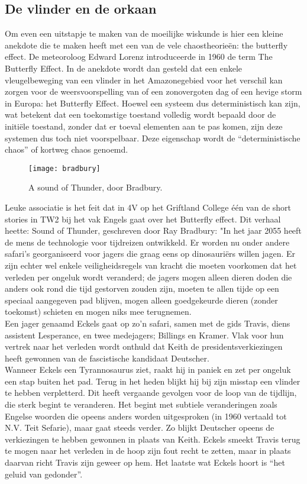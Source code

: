 \documentclass[11pt,fleqn]{book} %
\begin{document}
\subsection{De vlinder en de orkaan}
Om even een uitstapje te maken van de moeilijke wiskunde is hier een kleine anekdote die te maken heeft met een van de vele chaostheorieën: the butterfly effect.
De meteoroloog Edward Lorenz introduceerde in 1960 de term The Butterfly Effect. In de anekdote wordt dan gesteld dat een enkele vleugelbeweging van een vlinder in het Amazonegebied voor het verschil kan zorgen voor de weersvoorspelling van of een zonovergoten dag of een hevige storm in Europa: het Butterfly Effect. Hoewel een systeem dus deterministisch kan zijn, wat betekent dat een toekomstige toestand volledig wordt bepaald door de initiële toestand, zonder dat er toeval elementen aan te pas komen, zijn deze systemen dus toch niet voorspelbaar. Deze eigenschap wordt de “deterministische chaos” of kortweg chaos genoemd.
\begin{figure}[h]
	\centering\texttt{[image: bradbury]}
	\caption{A sound of Thunder, door Bradbury.}
	\label{fig:bradbury}
\end{figure}
Leuke associatie is het feit dat in 4V op het Griftland College één van de short stories in TW2 bij het vak Engels gaat over het Butterfly effect. Dit verhaal heette: Sound of Thunder, geschreven door Ray Bradbury:  "In het jaar 2055 heeft de mens de technologie voor tijdreizen ontwikkeld. Er worden nu onder andere safari’s georganiseerd voor jagers die graag eens op dinosauriërs willen jagen. Er zijn echter wel enkele veiligheidsregels van kracht die moeten voorkomen dat het verleden per ongeluk wordt veranderd; de jagers mogen alleen dieren doden die anders ook rond die tijd gestorven zouden zijn, moeten te allen tijde op een speciaal aangegeven pad blijven, mogen alleen goedgekeurde dieren (zonder toekomst) schieten en mogen niks mee terugnemen.\\
Een jager genaamd Eckels gaat op zo’n safari, samen met de gids Travis, diens assistent Lesperance, en twee medejagers; Billings en Kramer. Vlak voor hun vertrek naar het verleden wordt onthuld dat Keith de presidentsverkiezingen heeft gewonnen van de fascistische kandidaat Deutscher.\\
Wanneer Eckels een Tyrannosaurus ziet, raakt hij in paniek en zet per ongeluk een stap buiten het pad. Terug in het heden blijkt hij bij zijn misstap een vlinder te hebben verpletterd. Dit heeft vergaande gevolgen voor de loop van de tijdlijn, die sterk begint te veranderen. Het begint met subtiele veranderingen zoals Engelse woorden die opeens anders worden uitgesproken (in 1960 vertaald tot N.V. Teit Sefarie), maar gaat steeds verder. Zo blijkt Deutscher opeens de verkiezingen te hebben gewonnen in plaats van Keith. Eckels smeekt Travis terug te mogen naar het verleden in de hoop zijn fout recht te zetten, maar in plaats daarvan richt Travis zijn geweer op hem. Het laatste wat Eckels hoort is “het geluid van gedonder”.
\end{document}
